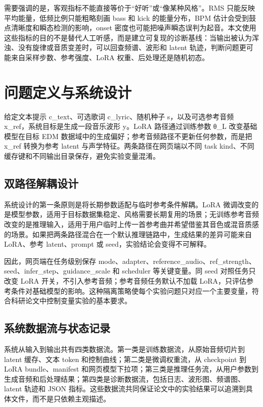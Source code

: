 \documentclass[UTF8,a4paper,zihao=-4,fontset=none]{ctexart}
\begin{document}
需要强调的是，客观指标不能直接等价于“好听”或“像某种风格”。RMS 只能反映平均能量，低频比例只能粗略刻画 bass 和 kick 的能量分布，BPM 估计会受到鼓点清晰度和瞬态检测的影响，onset 密度也可能把噪声瞬态误判为起音。本文使用这些指标的目的不是替代人工听感，而是建立可复现的诊断基线：当输出被认为浑浊、没有旋律或音质变差时，可以回查频谱、波形和 latent 轨迹，判断问题更可能来自采样步数、参考强度、LoRA 权重、后处理还是随机初态。

\section{问题定义与系统设计}
给定文本提示 c\_text、可选歌词 c\_lyric、随机种子 s，以及可选参考音频 x\_ref，系统目标是生成一段音乐波形 y。LoRA 路径通过训练参数 θ\_L 改变基础模型在目标 EDM 数据域中的生成偏好；参考音频路径不更新任何参数，而是把 x\_ref 转换为参考 latent 与声学特征。两条路径在网页端以不同 task kind、不同缓存键和不同输出目录保存，避免实验变量混淆。

\subsection{双路径解耦设计}
系统设计的第一条原则是将长期参数适配与临时参考条件解耦。LoRA 微调改变的是模型参数，适用于目标数据集稳定、风格需要长期复用的场景；无训练参考音频改变的是推理输入，适用于用户临时上传一首参考曲并希望借鉴其音色或混音质感的场景。如果把两条路径混合在一个默认推理链路中，生成结果的差异可能来自 LoRA、参考 latent、prompt 或 seed，实验结论会变得不可解释。

因此，网页端在任务级别保存 mode、adapter、reference\_audio、ref\_strength、seed、infer\_step、guidance\_scale 和 scheduler 等关键变量。同 seed 对照任务只改变 LoRA 开关，不引入参考音频；参考音频任务默认不加载 LoRA，只评估参考条件对基础模型的影响。这种隔离策略使每个实验问题只对应一个主要变量，符合科研论文中控制变量实验的基本要求。

\subsection{系统数据流与状态记录}
系统从输入到输出共有四类数据流。第一类是训练数据流，从原始音频切片到 latent 缓存、文本 token 和控制曲线；第二类是微调权重流，从 checkpoint 到 LoRA bundle、manifest 和网页模型下拉项；第三类是推理任务流，从用户参数到生成音频和后处理结果；第四类是诊断数据流，包括日志、波形图、频谱图、latent 轨迹和 JSON 指标。这些数据流共同保证论文中的实验结果可以追溯到具体文件，而不是只依赖主观描述。
\end{document}
